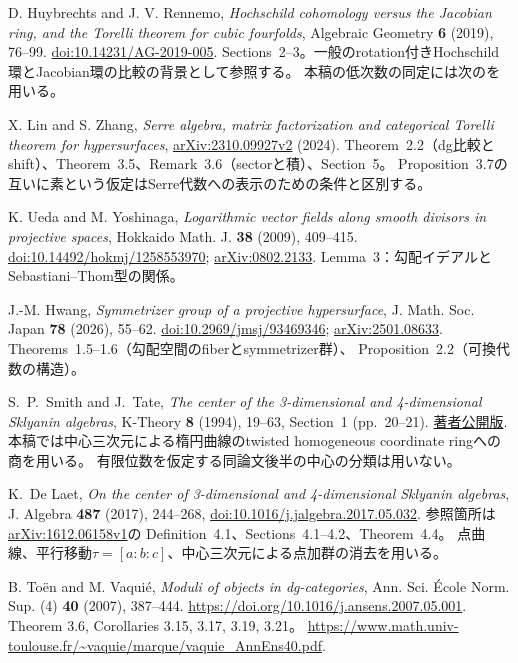 D. Huybrechts and J. V. Rennemo,
\emph{Hochschild cohomology versus the Jacobian ring, and the Torelli theorem for cubic fourfolds},
Algebraic Geometry \textbf{6} (2019), 76--99.
\href{https://doi.org/10.14231/AG-2019-005}{doi:10.14231/AG-2019-005}.
Sections~2--3。一般のrotation付きHochschild環とJacobian環の比較の背景として参照する。
本稿の低次数の同定には次の\cite{LZ}を用いる。

X. Lin and S. Zhang,
\emph{Serre algebra, matrix factorization and categorical Torelli theorem for hypersurfaces},
\href{https://arxiv.org/abs/2310.09927v2}{arXiv:2310.09927v2} (2024).
Theorem~2.2（dg比較とshift）、Theorem~3.5、Remark~3.6（sectorと積）、Section~5。
Proposition~3.7の互いに素という仮定はSerre代数への表示のための条件と区別する。

K. Ueda and M. Yoshinaga,
\emph{Logarithmic vector fields along smooth divisors in projective spaces},
Hokkaido Math. J. \textbf{38} (2009), 409--415.
\href{https://doi.org/10.14492/hokmj/1258553970}{doi:10.14492/hokmj/1258553970};
\href{https://arxiv.org/abs/0802.2133}{arXiv:0802.2133}.
Lemma~3：勾配イデアルとSebastiani--Thom型の関係。

J.-M. Hwang,
\emph{Symmetrizer group of a projective hypersurface},
J. Math. Soc. Japan \textbf{78} (2026), 55--62.
\href{https://doi.org/10.2969/jmsj/93469346}{doi:10.2969/jmsj/93469346};
\href{https://arxiv.org/abs/2501.08633}{arXiv:2501.08633}.
Theorems~1.5--1.6（勾配空間のfiberとsymmetrizer群）、
Proposition~2.2（可換代数の構造）。

S.~P.~Smith and J.~Tate,
\emph{The center of the 3-dimensional and 4-dimensional Sklyanin algebras},
K-Theory \textbf{8} (1994), 19--63, Section~1 (pp.~20--21).
\href{https://sites.math.washington.edu/~smith/Research/tate.pdf}{著者公開版}.
本稿では中心三次元による楕円曲線のtwisted homogeneous coordinate ringへの商を用いる。
有限位数を仮定する同論文後半の中心の分類は用いない。

K.~De Laet,
\emph{On the center of 3-dimensional and 4-dimensional Sklyanin algebras},
J. Algebra \textbf{487} (2017), 244--268,
\href{https://doi.org/10.1016/j.jalgebra.2017.05.032}{doi:10.1016/j.jalgebra.2017.05.032}.
参照箇所は\href{https://arxiv.org/abs/1612.06158}{arXiv:1612.06158v1}の
Definition~4.1、Sections~4.1--4.2、Theorem~4.4。
点曲線、平行移動$\tau=[a:b:c]$、中心三次元による点加群の消去を用いる。

 B. Toën and M. Vaquié,
\emph{Moduli of objects in dg-categories},
Ann. Sci. École Norm. Sup. (4) \textbf{40} (2007), 387--444.
\url{https://doi.org/10.1016/j.ansens.2007.05.001}.
Theorem 3.6, Corollaries 3.15, 3.17, 3.19, 3.21。
\url{https://www.math.univ-toulouse.fr/~vaquie/marque/vaquie_AnnEns40.pdf}.


